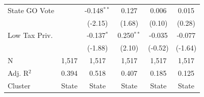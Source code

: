 \begin{tabular*}{\textwidth}{@{\extracolsep{\fill}}lccccc}
   State GO Vote        &                & -0.148$^{**}$  & 0.127        & 0.006          & 0.015\\   
                        &                & (-2.15)       & (1.68)      & (0.10)        & (0.28)\\   
   Low Tax Priv.        &                & -0.137$^{*}$   & 0.250$^{**}$ & -0.035         & -0.077\\   
                        &                & (-1.88)       & (2.10)      & (-0.52)       & (-1.64)\\   
   \hline
   N         & 1,517          & 1,517          & 1,517        & 1,517          & 1,517\\  
   Adj. R$^2$       & 0.394          & 0.518          & 0.407        & 0.185          & 0.125\\  
   Cluster              & State & State & State & State & State\\  
   \bottomrule
\end{tabular*}
\par\endgroup
